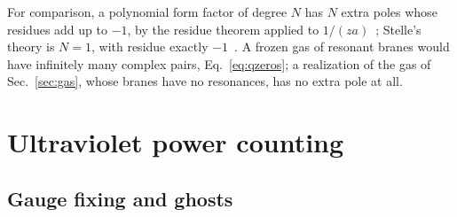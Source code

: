 \documentclass[aps,prd,10pt,twocolumn,superscriptaddress,nofootinbib,floatfix,longbibliography]{revtex4-2}
\begin{document}
For comparison, a polynomial form factor of degree $N$ has $N$ extra poles whose residues add up to $-1$, by the residue theorem applied to $1/(za)$~\cite{Shapiro2015}; Stelle's theory is $N=1$, with residue exactly $-1$~\cite{Stelle1977}. A frozen gas of resonant branes would have infinitely many complex pairs, Eq.~\eqref{eq:qzeros}; a realization of the gas of Sec.~\ref{sec:gas}, whose branes have no resonances, has no extra pole at all.

\section{Ultraviolet power counting}
\label{sec:power}

\subsection{Gauge fixing and ghosts}
\label{sec:gf}
\end{document}
